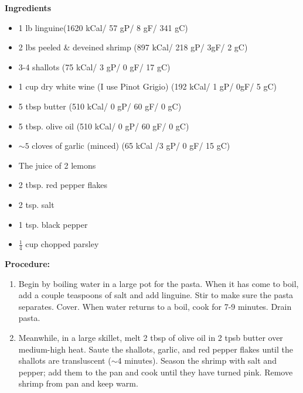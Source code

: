 \documentclass{report}
\begin{document}


\bigskip

\bigskip

\begin{multicols}{2}
\textbf{Ingredients}
\begin{itemize}
\item 1 lb linguine\quad (1620 kCal/ 57 gP/ 8 gF/ 341 gC)
\item 2 lbs peeled \& deveined shrimp \newline(897 kCal/ 218 gP/ 3gF/ 2 gC)
\item 3-4 shallots  \quad (75 kCal/ 3 gP/ 0 gF/ 17 gC)
\item 1 cup dry white wine (I use Pinot Grigio)
\newline  (192 kCal/ 1 gP/ 0gF/ 5 gC)
\item 5 tbsp butter \quad (510 kCal/ 0 gP/ 60 gF/ 0 gC)
\item 5 tbsp. olive oil \quad (510 kCal/ 0 gP/ 60 gF/ 0 gC)
\item $\sim 5$ cloves of garlic (minced) (65 kCal /3 gP/ 0 gF/ 15 gC)
\item The juice of 2 lemons
\item 2 tbsp. red pepper flakes
\item 2 tsp. salt
\item 1 tsp. black pepper
\item $\frac{1}{4}$ cup chopped parsley 



\end{itemize}


\columnbreak
\textbf{Procedure:}
\medskip


\begin{enumerate}
\item Begin by boiling water in a large pot for the pasta. When it has come to boil, add a couple teaspoons of salt and add linguine. Stir to make sure the pasta separates. Cover. When water returns to a boil, cook for 7-9 minutes. Drain pasta. 


\medskip
\item Meanwhile, in a large skillet, melt 2 tbsp of olive oil in 2 tpsb butter over medium-high heat. Saute the shallots, garlic, and red pepper flakes until the shallots are transluscent ($\sim$4 minutes). Season the shrimp with salt and pepper; add them to the pan and cook until they have turned pink. Remove shrimp from pan and keep warm. 
\medskip


\end{enumerate}
\end{multicols}
\end{document}

